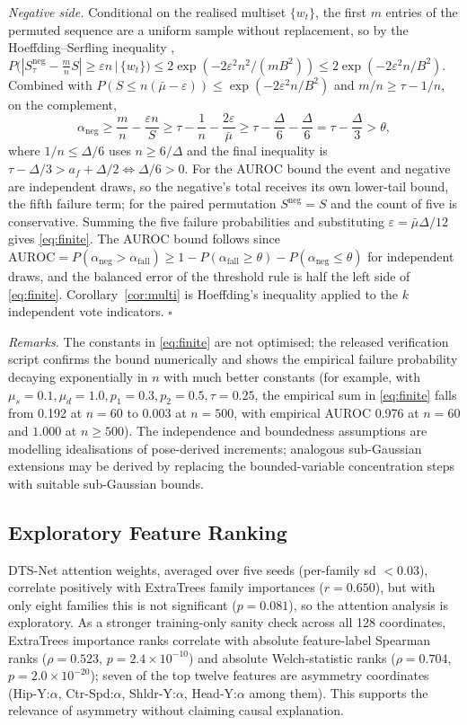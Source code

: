 \emph{Negative side.} Conditional on the realised multiset $\{w_t\}$, the first $m$ entries of the permuted sequence are a uniform sample without replacement, so by the Hoeffding--Serfling inequality \citep{hoeffding1963,serfling1974},
$P\big(|S^{\mathrm{neg}}_\tau-\tfrac{m}{n}S|\geq\varepsilon n\,\big|\,\{w_t\}\big)\leq2\exp(-2\varepsilon^2n^2/(mB^2))\leq2\exp(-2\varepsilon^2n/B^2)$.
Combined with $P(S\leq n(\bar\mu-\varepsilon))\leq\exp(-2\varepsilon^2 n/B^2)$ and $m/n\geq\tau-1/n$, on the complement,
\[
\alpha_{\mathrm{neg}}\geq\frac{m}{n}-\frac{\varepsilon n}{S}\geq\tau-\frac{1}{n}-\frac{2\varepsilon}{\bar\mu}
\geq\tau-\frac{\Delta}{6}-\frac{\Delta}{6}=\tau-\frac{\Delta}{3}>\theta ,
\]
where $1/n\leq\Delta/6$ uses $n\geq6/\Delta$ and the final inequality is $\tau-\Delta/3>a_f+\Delta/2\iff\Delta/6>0$. For the AUROC bound the event and negative are independent draws, so the negative's total receives its own lower-tail bound, the fifth failure term; for the paired permutation $S^{\mathrm{neg}}=S$ and the count of five is conservative. Summing the five failure probabilities and substituting $\varepsilon=\bar\mu\Delta/12$ gives \eqref{eq:finite}. The AUROC bound follows since $\mathrm{AUROC}=P(\alpha_{\mathrm{neg}}>\alpha_{\mathrm{fall}})\geq1-P(\alpha_{\mathrm{fall}}\geq\theta)-P(\alpha_{\mathrm{neg}}\leq\theta)$ for independent draws, and the balanced error of the threshold rule is half the left side of \eqref{eq:finite}. Corollary~\ref{cor:multi} is Hoeffding's inequality applied to the $k$ independent vote indicators. \hfill$\square$

\emph{Remarks.} The constants in \eqref{eq:finite} are not optimised; the released verification script confirms the bound numerically and shows the empirical failure probability decaying exponentially in $n$ with much better constants (for example, with $\mu_s{=}0.1,\mu_d{=}1.0,p_1{=}0.3,p_2{=}0.5,\tau{=}0.25$, the empirical sum in \eqref{eq:finite} falls from 0.192 at $n{=}60$ to 0.003 at $n{=}500$, with empirical AUROC 0.976 at $n{=}60$ and $1.000$ at $n{\geq}500$). The independence and boundedness assumptions are modelling idealisations of pose-derived increments; analogous sub-Gaussian extensions may be derived by replacing the bounded-variable concentration steps with suitable sub-Gaussian bounds.

\subsection{Exploratory Feature Ranking}
DTS-Net attention weights, averaged over five seeds (per-family sd $<0.03$), correlate positively with ExtraTrees family importances ($r=0.650$), but with only eight families this is not significant ($p=0.081$), so the attention analysis is exploratory. As a stronger training-only sanity check across all 128 coordinates, ExtraTrees importance ranks correlate with absolute feature-label Spearman ranks ($\rho=0.523$, $p=2.4{\times}10^{-10}$) and absolute Welch-statistic ranks ($\rho=0.704$, $p=2.0{\times}10^{-20}$); seven of the top twelve features are asymmetry coordinates (Hip-Y:$\alpha$, Ctr-Spd:$\alpha$, Shldr-Y:$\alpha$, Head-Y:$\alpha$ among them). This supports the relevance of asymmetry without claiming causal explanation.

